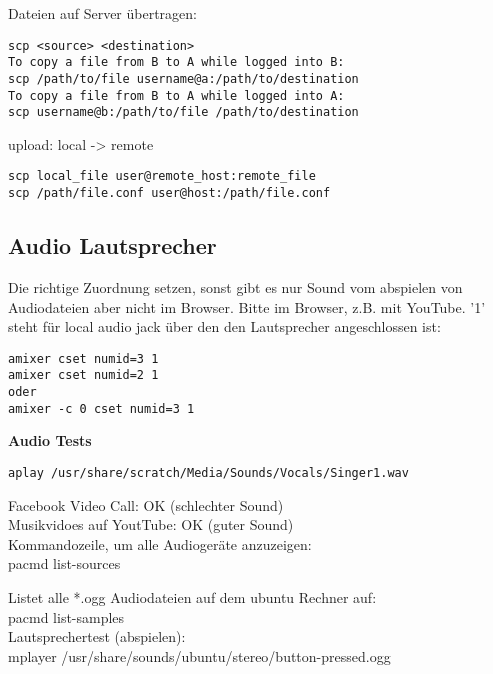 Dateien auf Server übertragen:
\begin{verbatim}
scp <source> <destination>
To copy a file from B to A while logged into B:
scp /path/to/file username@a:/path/to/destination
To copy a file from B to A while logged into A:
scp username@b:/path/to/file /path/to/destination
\end{verbatim}
upload: local -> remote
\begin{verbatim}
scp local_file user@remote_host:remote_file
scp /path/file.conf user@host:/path/file.conf
\end{verbatim}


\subsection{Audio Lautsprecher}

Die richtige Zuordnung setzen, sonst gibt es nur Sound vom 
abspielen von Audiodateien aber nicht im Browser. Bitte im 
Browser, z.B. mit YouTube. '1' steht für local audio jack über 
den den Lautsprecher angeschlossen ist:
\begin{verbatim}
amixer cset numid=3 1
amixer cset numid=2 1
oder
amixer -c 0 cset numid=3 1
\end{verbatim}

\textbf{Audio Tests}
\begin{verbatim}aplay /usr/share/scratch/Media/Sounds/Vocals/Singer1.wav\end{verbatim}
Facebook Video Call: OK (schlechter Sound)\\
Musikvidoes auf YoutTube: OK (guter Sound)\\

Kommandozeile, um alle Audiogeräte anzuzeigen:\\
pacmd list-sources

Listet alle *.ogg Audiodateien auf dem ubuntu Rechner auf:\\
pacmd list-samples\\
Lautsprechertest (abspielen):\\
mplayer /usr/share/sounds/ubuntu/stereo/button-pressed.ogg 

